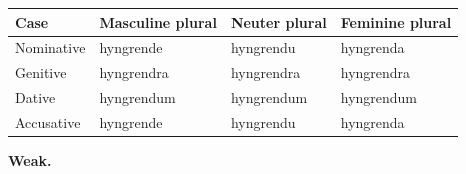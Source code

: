 \par\addvspace{5pt}
\par\begingroup
\fontsize{10.5}{13.2}\selectfont
\par\begin{minipage}{\linewidth}\raggedright
\setlength{\LTleft}{0pt}\setlength{\LTright}{\fill}
\noindent
\begin{tabular}{@{}>{\raggedright\arraybackslash}p{22mm}>{\raggedright\arraybackslash}p{31.18mm}>{\raggedright\arraybackslash}p{31.18mm}>{\raggedright\arraybackslash}p{31.18mm}@{}}
\toprule
\textbf{Case} & \textbf{Masculine plural} & \textbf{Neuter plural} & \textbf{Feminine plural} \\
\midrule
Nominative & hyngrende & hyngrendu & hyngrenda \\
Genitive & hyngrendra & hyngrendra & hyngrendra \\
Dative & hyngrendum & hyngrendum & hyngrendum \\
Accusative & hyngrende & hyngrendu & hyngrenda \\
\bottomrule
\end{tabular}
\end{minipage}\par
\par\endgroup
\par\addvspace{5pt}

\textbf{Weak.}

